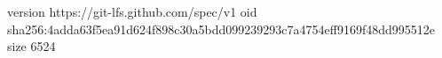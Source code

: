 version https://git-lfs.github.com/spec/v1
oid sha256:4adda63f5ea91d624f898c30a5bdd099239293c7a4754eff9169f48dd995512e
size 6524
